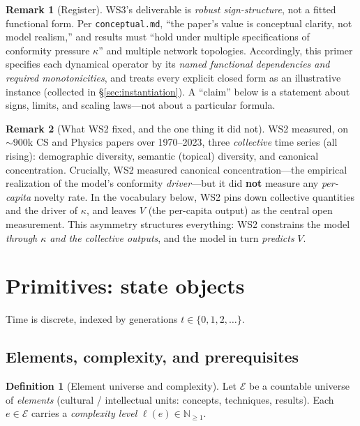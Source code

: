 \documentclass[11pt,letterpaper]{article}
\theoremstyle{definition}
\newtheorem{definition}{Definition}[section]
\newtheorem{remark}{Remark}[section]
\theoremstyle{plain}
\newcommand{\E}{\mathcal{E}}
\newcommand{\Nat}{\mathbb{N}}
\begin{document}
\begin{remark}[Register]
WS3's deliverable is \emph{robust sign-structure}, not a fitted functional form.
Per \texttt{conceptual.md}, ``the paper's value is conceptual clarity, not model
realism,'' and results must ``hold under multiple specifications of conformity
pressure $\kappa$'' and multiple network topologies. Accordingly, this primer
specifies each dynamical operator by its \emph{named functional dependencies and
required monotonicities}, and treats every explicit closed form as an
illustrative instance (collected in \S\ref{sec:instantiation}). A ``claim'' below
is a statement about signs, limits, and scaling laws---not about a particular
formula.
\end{remark}

\begin{remark}[What WS2 fixed, and the one thing it did not]\label{rem:ws2role}
WS2 measured, on $\sim\!900$k CS and Physics papers over 1970--2023, three
\emph{collective} time series (all rising): demographic diversity, semantic
(topical) diversity, and canonical concentration. Crucially, WS2 measured
canonical concentration---the empirical realization of the model's conformity
\emph{driver}---but it did \textbf{not} measure any \emph{per-capita} novelty
rate. In the vocabulary below, WS2 pins down collective quantities and the driver
of $\kappa$, and leaves $V$ (the per-capita output) as the central open measurement.
This asymmetry structures everything: WS2 constrains the model \emph{through
$\kappa$ and the collective outputs}, and the model in turn \emph{predicts} $V$.
\end{remark}

\section{Primitives: state objects}\label{sec:primitives}

Time is discrete, indexed by generations $t \in \{0,1,2,\dots\}$.

\subsection{Elements, complexity, and prerequisites}

\begin{definition}[Element universe and complexity]
Let $\E$ be a countable universe of \emph{elements} (cultural / intellectual
units: concepts, techniques, results). Each $e\in\E$ carries a \emph{complexity
level} $\ell(e)\in\Nat_{\ge 1}$.
\end{definition}
\end{document}
